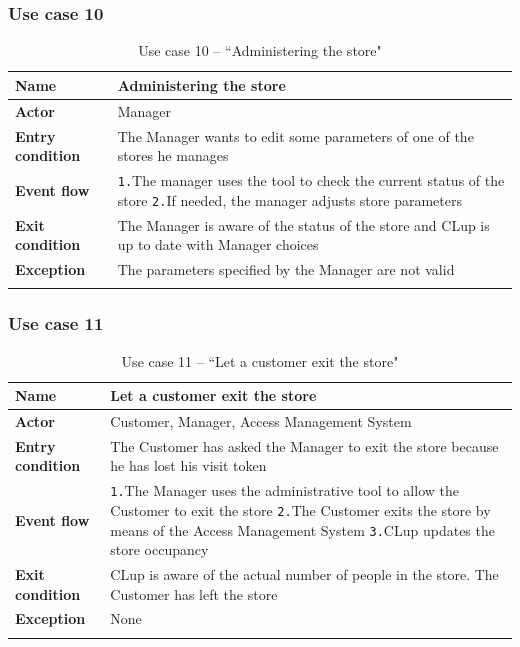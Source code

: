 \documentclass[a4paper,oneside,11pt]{book}   %
\begin{document}
    \subsubsection{Use case 10}
    \begin{longtable}[c] { |>{\bfseries{}}C{0.25\textwidth}|H{0.55\textwidth}| }
        \hline
        Name            & Administering the store \\ \hline
        Actor           & Manager \\ \hline
        Entry condition & The Manager wants to edit some parameters of one of the stores he manages \\ \hline
        Event flow      & 
        \texttt{1.}The manager uses the tool to check the current status of the store \newline
        \texttt{2.}If needed, the manager adjusts store parameters \newline \\ \hline
        Exit condition  & The Manager is aware of the status of the store and CLup is up to date with Manager choices \\ \hline
        Exception       & The parameters specified by the Manager are not valid \\
        \hline
    \caption{Use case 10 -- ``Administering the store"}
    \label{table:use_case_10}
    \end{longtable}
    
    \subsubsection{Use case 11}
    \begin{longtable}[c] { |>{\bfseries{}}C{0.25\textwidth}|H{0.55\textwidth}| }
        \hline
        Name            & Let a customer exit the store \\ \hline
        Actor           & Customer, Manager, Access Management System \\ \hline
        Entry condition & The Customer has asked the Manager to exit the store because he has lost his visit token \\ \hline
        Event flow      & 
        \texttt{1.}The Manager uses the administrative tool to allow the Customer to exit the store \newline
        \texttt{2.}The Customer exits the store by means of the Access Management System \newline
        \texttt{3.}CLup updates the store occupancy \\ \hline
        Exit condition  & CLup is aware of the actual number of people in the store. The Customer has left the store \\ \hline
        Exception       & None \\
        \hline
    \caption{Use case 11 -- ``Let a customer exit the store"}
    \label{table:use_case_11}
    \end{longtable}
    
\end{document}
